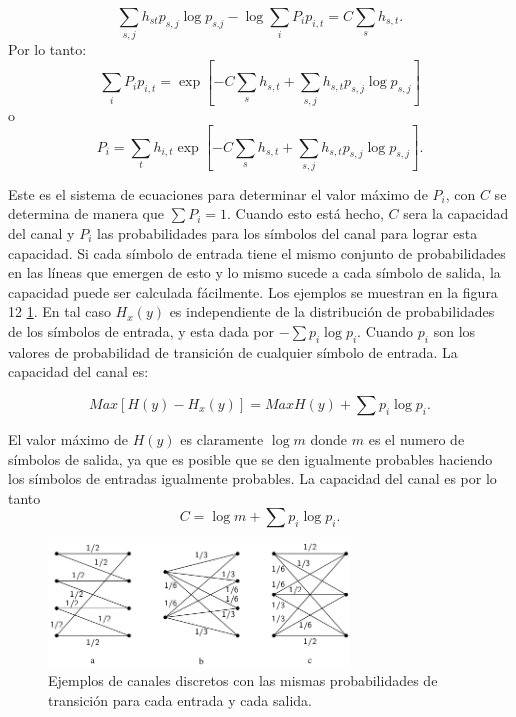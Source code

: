 \begin{equation}
  \sum_{s,j}h_{st} p_{s,j} \log{p_{s.j}} - \log{\sum_{i}P_i p_{i,t}} = C \sum_{s} h_{s,t}.
\end{equation}
Por lo tanto:
\begin{equation}
  \sum_{i} P_i p_{i,t} = \exp[- C \sum_{s} h_{s,t}+ \sum_{s,j} h_{s,t} p_{s,j} \log{p_{s,j}}]
\end{equation}
o  
\begin{equation}
  P_i = \sum_{t} h_{i,t} \exp[ - C \sum_{s} h_{s,t}+ \sum_{s,j} h_{s,t} p_{s,j} \log{p_{s,j}} ].
\end{equation}

Este es el sistema de ecuaciones para determinar el valor m\'aximo de
$P_i$, con $C$ se determina de manera que $\sum P_i = 1$. Cuando esto
est\'{a} hecho, $C$ sera la capacidad del canal y $P_i$ las
probabilidades para los s\'imbolos del canal para lograr esta
capacidad.  Si cada s\'imbolo de entrada tiene el mismo conjunto de
probabilidades en las l\'ineas que emergen de esto y lo mismo sucede a
cada s\'imbolo de salida, la capacidad puede ser calculada
f\'acilmente. Los ejemplos se muestran en la figura 12 \ref{fig:12}.
En tal caso $H_x (y)$ es independiente de la distribuci\'on de
probabilidades de los s\'imbolos de entrada, y esta dada por $-\sum
p_i \log{p_i}$. Cuando $p_i$ son los valores de probabilidad de
transici\'on de cualquier s\'imbolo de entrada. La capacidad del canal
es:

\begin{equation}
  Max [H(y) - H_x(y)] = Max H(y) + \sum p_i \log{p_i}.
\end{equation}

El valor m\'aximo de $H(y)$ es claramente  $\log{m}$ donde $m$ es el numero de s\'imbolos de salida, ya que es posible que se den 
igualmente probables haciendo los s\'imbolos de entradas igualmente probables. La capacidad del canal es por lo tanto
\begin{equation}
  C = \log{m} + \sum p_i \log{p_i}.
\end{equation}

\begin{figure}[!ht]
\centerline{\includegraphics[width=80mm]{Imagenes/SinComentarios/Pagina27-Figura12.png}}
\caption{Ejemplos de canales discretos con las mismas probabilidades de
 transici\'{o}n para cada entrada y cada salida.}
\label{fig:12}
\end{figure}


